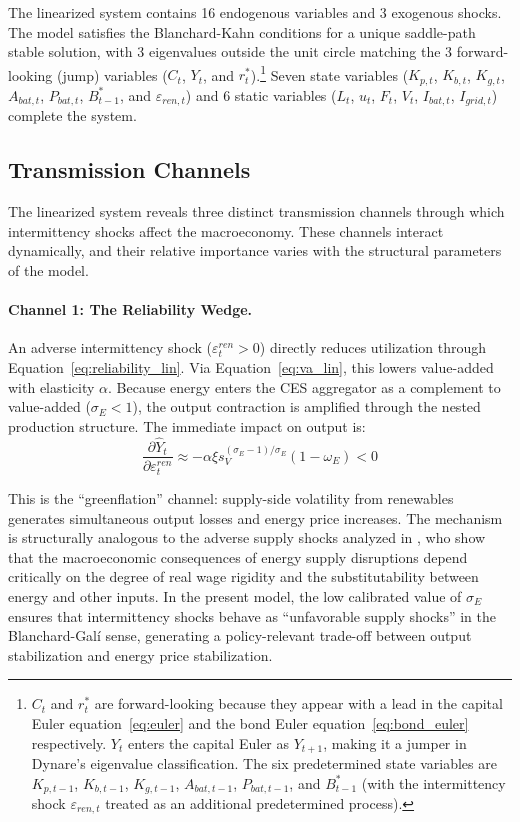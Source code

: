 \documentclass[12pt, a4paper]{article}
\begin{document}
The linearized system contains 16 endogenous variables and 3 exogenous shocks. The model satisfies the Blanchard-Kahn conditions \citep{blanchard1980} for a unique saddle-path stable solution, with 3 eigenvalues outside the unit circle matching the 3 forward-looking (jump) variables ($C_t$, $Y_t$, and $r^*_t$).\footnote{$C_t$ and $r^*_t$ are forward-looking because they appear with a lead in the capital Euler equation~\eqref{eq:euler} and the bond Euler equation~\eqref{eq:bond_euler} respectively. $Y_t$ enters the capital Euler as $Y_{t+1}$, making it a jumper in Dynare's eigenvalue classification. The six predetermined state variables are $K_{p,t-1}$, $K_{b,t-1}$, $K_{g,t-1}$, $A_{bat,t-1}$, $P_{bat,t-1}$, and $B^*_{t-1}$ (with the intermittency shock $\varepsilon_{ren,t}$ treated as an additional predetermined process).} Seven state variables ($K_{p,t}$, $K_{b,t}$, $K_{g,t}$, $A_{bat,t}$, $P_{bat,t}$, $B^*_{t-1}$, and $\varepsilon_{ren,t}$) and 6 static variables ($L_t$, $u_t$, $F_t$, $V_t$, $I_{bat,t}$, $I_{grid,t}$) complete the system.

\subsection{Transmission Channels} \label{subsec:transmission}

The linearized system reveals three distinct transmission channels through which intermittency shocks affect the macroeconomy. These channels interact dynamically, and their relative importance varies with the structural parameters of the model.

\paragraph{Channel 1: The Reliability Wedge.}
An adverse intermittency shock ($\varepsilon^{ren}_t > 0$) directly reduces utilization through Equation~\eqref{eq:reliability_lin}. Via Equation~\eqref{eq:va_lin}, this lowers value-added with elasticity $\alpha$. Because energy enters the CES aggregator as a complement to value-added ($\sigma_E < 1$), the output contraction is amplified through the nested production structure. The immediate impact on output is:
\begin{equation}
\frac{\partial \hat{Y}_t}{\partial \varepsilon^{ren}_t} \approx -\alpha \xi s_V^{(\sigma_E-1)/\sigma_E}(1-\omega_E) < 0
\end{equation}

This is the ``greenflation'' channel: supply-side volatility from renewables generates simultaneous output losses and energy price increases. The mechanism is structurally analogous to the adverse supply shocks analyzed in \citet{blanchard2007}, who show that the macroeconomic consequences of energy supply disruptions depend critically on the degree of real wage rigidity and the substitutability between energy and other inputs. In the present model, the low calibrated value of $\sigma_E$ ensures that intermittency shocks behave as ``unfavorable supply shocks'' in the Blanchard-Gal\'{i} sense, generating a policy-relevant trade-off between output stabilization and energy price stabilization.
\end{document}
